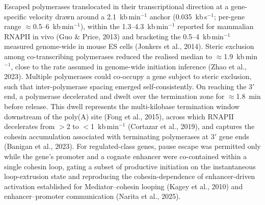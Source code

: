 \documentclass[11pt]{article}
\begin{document}
Escaped polymerases translocated in their transcriptional direction at a gene-specific
velocity drawn around a 2.1~kb\,min$^{-1}$ anchor (0.035~kb\,s$^{-1}$; per-gene range
$\approx$0.5--6~kb\,min$^{-1}$), within the 1.3--4.3~kb\,min$^{-1}$ reported for
mammalian RNAPII in vivo (Guo \& Price, 2013) and bracketing the 0.5--4~kb\,min$^{-1}$
measured genome-wide in mouse ES cells (Jonkers et al., 2014). Steric exclusion among
co-transcribing polymerases reduced the realised median to $\approx$1.9~kb\,min$^{-1}$,
close to the rate assumed in genome-wide initiation inference (Zhao et al., 2023).
Multiple polymerases could co-occupy a gene subject to steric exclusion, such that 
inter-polymerase spacing emerged self-consistently. On reaching the 3$'$ end, a
polymerase decelerated and dwelt over the termination zone for $\approx$1.8~min before
release. This dwell represents the multi-kilobase termination window downstream of the
poly(A) site (Fong et al., 2015), across which RNAPII decelerates from $>$2 to
$<$1~kb\,min$^{-1}$ (Cortazar et al., 2019), and captures the cohesin accumulation associated with terminating polymerases at 3$'$ gene ends (Banigan et al., 2023). For regulated-class genes, pause
escape was permitted only while the gene's promoter and a cognate enhancer were
co-contained within a single cohesin loop, gating a subset of productive initiation on
the instantaneous loop-extrusion state and reproducing the cohesin-dependence of
enhancer-driven activation established for Mediator--cohesin looping (Kagey et al.,
2010) and enhancer--promoter communication (Narita et al., 2025).
\end{document}
